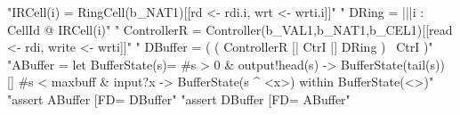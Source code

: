 \documentclass[10pt]{article}
\begin{document}
\begin{assert}
"IRCell(i) = RingCell(b_NAT1)[[rd <- rdi.i, wrt <- wrti.i]]"
\also " DRing = |||i : CellId @ IRCell(i)"
\also " ControllerR = Controller(b_VAL1,b_NAT1,b_CEL1)[[read <- rdi, write <- wrti]]"
\also " DBuffer = ( ( ControllerR [| CtrI |] DRing ) \ CtrI )"
\also "ABuffer = let BufferState(s)= #s > 0 & output!head(s) -> BufferState(tail(s)) [] #s < maxbuff & input?x -> BufferState(s ^ <x>) within BufferState(<>)"
\also "assert ABuffer [FD= DBuffer"
\also "assert DBuffer [FD= ABuffer"
\end{assert}
\end{document}
